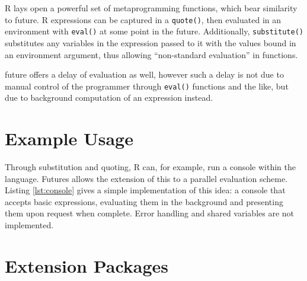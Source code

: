 \documentclass[10pt,a4paper]{article}
\begin{document}
R lays open a powerful set of metaprogramming functions, which bear
similarity to future. R expressions can be captured in a
\texttt{quote()}, then evaluated in an environment with \texttt{eval()}
at some point in the future. Additionally, \texttt{substitute()}
substitutes any variables in the expression passed to it with the
values bound in an environment argument, thus allowing ``non-standard
evaluation'' in functions.

future offers a delay of evaluation as well, however such a delay is
not due to manual control of the programmer through \texttt{eval()}
functions and the like, but due to background computation of an
expression instead.

\section{Example Usage}
\label{sec:examples}

Through substitution and quoting, R can, for example, run a console within the
language. Futures allows the extension of this to a parallel evaluation scheme.
Listing \ref{lst:console} gives a simple implementation of this idea: a console
that accepts basic expressions, evaluating them in the background and
presenting them upon request when complete.  Error handling and shared
variables are not implemented.



\section{Extension Packages}
\label{sec:extension-packages}
\end{document}
